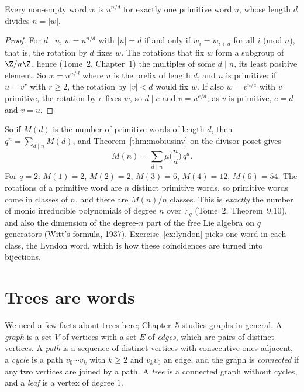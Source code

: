 \begin{lemma}\label{lem:primitive}
Every non-empty word $w$ is $u^{n/d}$ for exactly one primitive word $u$, whose length $d$ divides $n=|w|$.
\end{lemma}
\begin{proof}
For $d\mid n$, $w=u^{n/d}$ with $|u|=d$ if and only if $w_i=w_{i+d}$ for all $i$ (mod $n$), that is, the rotation by $d$ fixes $w$. The rotations that
fix $w$ form a subgroup of $\Z/n\Z$, hence (Tome~2, Chapter~1) the multiples of some $d\mid n$, its least positive element. So $w=u^{n/d}$
where $u$ is the prefix of length $d$, and $u$ is primitive: if $u=v^r$ with $r\ge2$, the rotation by $|v|<d$ would fix $w$. If also $w=v^{n/e}$
with $v$ primitive, the rotation by $e$ fixes $w$, so $d\mid e$ and $v=u^{e/d}$; as $v$ is primitive, $e=d$ and $v=u$.
\end{proof}

So if $M(d)$ is the number of primitive words of length $d$, then $q^n=\sum_{d\mid n}M(d)$, and Theorem~\ref{thm:mobiusinv} on the
divisor poset gives
\[
M(n)=\sum_{d\mid n}\mu\Big(\frac nd\Big)\,q^d .
\]
For $q=2$: $M(1)=2$, $M(2)=2$, $M(3)=6$, $M(4)=12$, $M(6)=54$. The rotations of a primitive word are $n$ distinct primitive words, so
primitive words come in classes of $n$, and there are $M(n)/n$ classes. This is \emph{exactly} the number of monic irreducible
polynomials of degree $n$ over $\mathbb F_q$ (Tome~2, Theorem~9.10), and also the dimension of the degree-$n$ part of the free Lie
algebra on $q$ generators (Witt's formula, 1937). Exercise~\ref{ex:lyndon} picks one word in each class, the Lyndon word, which
is how these coincidences are turned into bijections.

\section{Trees are words}

We need a few facts about trees here; Chapter~5 studies graphs in general. A \emph{graph} is a set $V$ of vertices with a set $E$ of
\emph{edges}, which are pairs of distinct vertices. A \emph{path} is a sequence of distinct vertices with consecutive ones adjacent, a \emph{cycle}
is a path $v_0\cdots v_k$ with $k\ge2$ and $v_kv_0$ an edge, and the graph is \emph{connected} if any two vertices are joined by a path. A \emph{tree} is a
connected graph without cycles, and a \emph{leaf} is a vertex of degree $1$.

